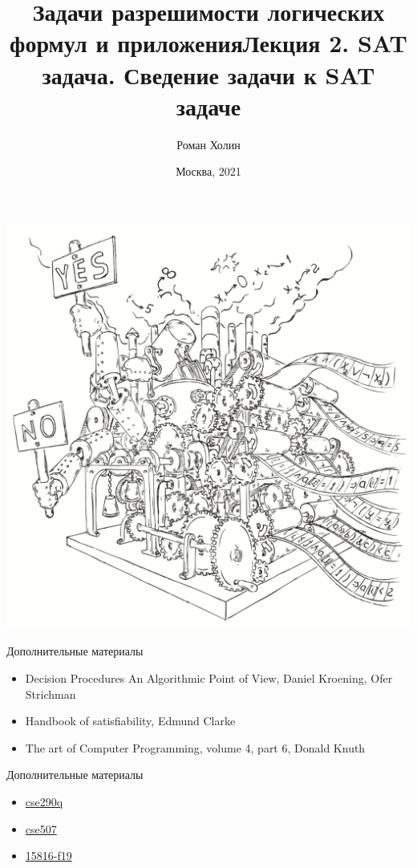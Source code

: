 \documentclass{beamer}
\begin{document}
\title{Задачи разрешимости логических формул и приложения\newline Лекция 2. SAT задача. Сведение задачи к SAT задаче}
\author{Роман Холин}
\date{Москва, 2021}

\begin{frame}
\includegraphics[scale=0.5]{../decision-procedure.png}
\end{frame}

\frame{\titlepage}

\begin{frame}{Дополнительные материалы}
\begin{itemize}
\item Decision Procedures An Algorithmic Point of View, Daniel Kroening, Ofer Strichman
\item Handbook of satisfiability, Edmund Clarke
\item The art of Computer Programming, volume 4, part 6, Donald Knuth
\end{itemize}
\end{frame}

\begin{frame}{Дополнительные материалы}
\begin{itemize}
\item \href{http://composition.al/CSE290Q-2019-09/index.html}{cse290q}
\item \href{https://courses.cs.washington.edu/courses/cse507/19au/calendar.html}{cse507}
\item \href{https://www.cs.cmu.edu/~mheule/15816-f19/schedule.html}{15816-f19}
\end{itemize}
\end{frame}
\end{document}
